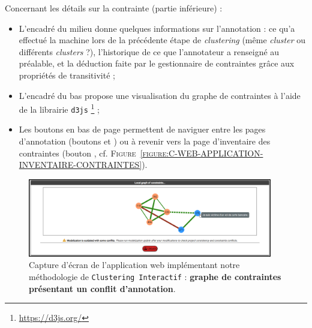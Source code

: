 			Concernant les détails sur la contrainte (partie inférieure) :
			\begin{itemize}
				\item L'encadré du milieu donne quelques informations sur l'annotation : ce qu'a effectué la machine lors de la précédente étape de \textit{clustering} (même \textit{cluster} ou différents \textit{clusters} ?), l'historique de ce que l'annotateur a renseigné au préalable, et la déduction faite par le gestionnaire de contraintes grâce aux propriétés de transitivité ;
				\item L'encadré du bas propose une visualisation du graphe de contraintes à l'aide de la librairie \texttt{d3js} \footnote {
					\url{https://d3js.org/}
				} ;
				\item Les boutons en bas de page permettent de naviguer entre les pages d'annotation (boutons \textguillemets{\faAngleLeft} et \textguillemets{\faAngleRight}) ou à revenir vers la page d'inventaire des contraintes (bouton \textguillemets{\faList}, cf. \textsc{Figure~\ref{figure:C-WEB-APPLICATION-INVENTAIRE-CONTRAINTES}}).
			\end{itemize}
			
			\begin{figure}[H]
				\centering
				\includegraphics[width=0.95\textwidth]{figures/interactive-clustering-application-annotation-4conflit}
				\caption{
					Capture d'écran de l'application web implémentant notre méthodologie de \texttt{Clustering Interactif} : \textbf{graphe de contraintes présentant un conflit d'annotation}.
				}
				\label{figure:C-WEB-APPLICATION-CONFLIT}
			\end{figure}
			
